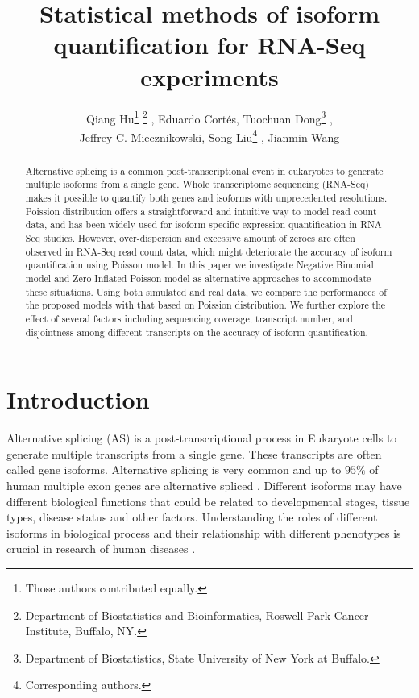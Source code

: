 \documentclass[11pt]{article}
\begin{document}
\title{Statistical methods of isoform quantification for RNA-Seq experiments}
\author{Qiang Hu\thanks{Those authors contributed equally.} \thanks{Department of Biostatistics and Bioinformatics, Roswell Park Cancer Institute, Buffalo, NY.} , Eduardo Cort\'es\footnotemark[1] \footnotemark[2] , Tuochuan Dong\thanks{Department of Biostatistics, State University of New York at Buffalo.} , \\ Jeffrey C. Miecznikowski\footnotemark[3] , Song Liu\footnotemark[1] \footnote{Corresponding authors.} , Jianmin Wang\footnotemark[1] \footnotemark[4]}
\date{}

\maketitle
\begin{abstract}
Alternative splicing is a common post-transcriptional event in eukaryotes to generate multiple isoforms from a single gene. Whole transcriptome sequencing (RNA-Seq) makes it possible to quantify both genes and isoforms with unprecedented resolutions. 
Poission distribution offers a straightforward and intuitive way to model read count data, and has been widely used for isoform specific expression quantification in RNA-Seq studies. 
However, over-dispersion and excessive amount of zeroes are often observed in RNA-Seq read count data, which might deteriorate the accuracy of isoform quantification using Poisson model. In this paper we investigate Negative Binomial model and Zero Inflated Poisson model as alternative approaches to accommodate these situations. Using both simulated and real data, we compare the performances of the proposed models with that based on Poission distribution. We further explore the effect of several factors including sequencing coverage, transcript number, and disjointness among different transcripts on the accuracy of isoform quantification.\\

\end{abstract}
\newpage
\tableofcontents
\newpage
\section{Introduction}

Alternative splicing (AS) is a post-transcriptional process in Eukaryote cells to generate multiple transcripts from a single gene. These transcripts are often called gene isoforms. Alternative splicing is very common and up to  $95\%$  of human multiple exon genes are alternative spliced \cite{pan2008deep}. Different isoforms may have different biological functions that could be related to developmental stages, tissue types, disease status and other factors. Understanding the roles of different isoforms in biological process and their relationship with different phenotypes is crucial in research of human diseases \cite{matlin2005understanding, he2009global}.  \\
\end{document}
